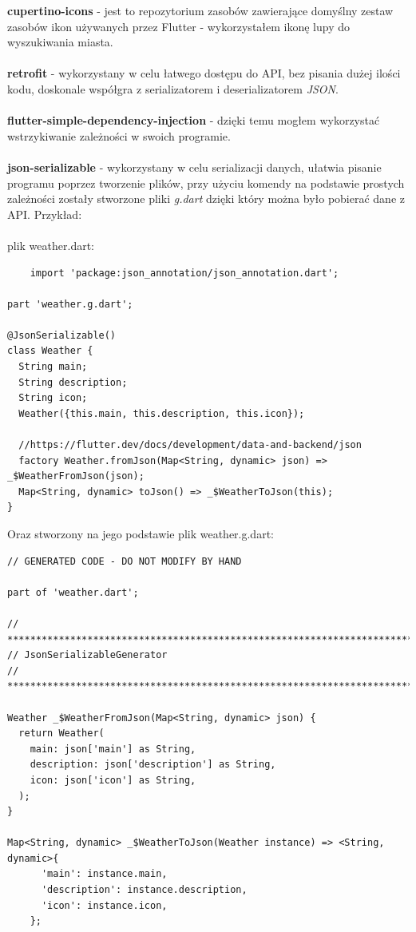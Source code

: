 \documentclass[12pt,a4paper]{article}
\begin{document}
    \newpage
    
    \textbf{cupertino-icons} - jest to repozytorium zasobów zawierające domyślny zestaw zasobów ikon używanych przez Flutter - wykorzystałem ikonę lupy do wyszukiwania miasta. \\ \\
    \textbf{retrofit} - wykorzystany w celu łatwego dostępu do API, bez pisania dużej ilości kodu, doskonale współgra z serializatorem i deserializatorem \textit{JSON}. \\ \\
    \textbf{flutter-simple-dependency-injection} - dzięki temu mogłem wykorzystać wstrzykiwanie zależności w swoich programie. \\ \\
    \textbf{json-serializable} - wykorzystany w celu serializacji danych, ułatwia pisanie programu poprzez tworzenie plików, przy użyciu komendy na podstawie prostych zależności zostały stworzone pliki \textit{g.dart} dzięki który można było pobierać dane z API. Przykład: \\ \\
    plik weather.dart:
    \begin{verbatim}
    import 'package:json_annotation/json_annotation.dart';

part 'weather.g.dart';

@JsonSerializable()
class Weather {
  String main;
  String description;
  String icon;
  Weather({this.main, this.description, this.icon});

  //https://flutter.dev/docs/development/data-and-backend/json
  factory Weather.fromJson(Map<String, dynamic> json) => _$WeatherFromJson(json);
  Map<String, dynamic> toJson() => _$WeatherToJson(this);
}

    \end{verbatim}
Oraz stworzony na jego podstawie plik weather.g.dart:
\begin{verbatim}
// GENERATED CODE - DO NOT MODIFY BY HAND

part of 'weather.dart';

// **************************************************************************
// JsonSerializableGenerator
// **************************************************************************

Weather _$WeatherFromJson(Map<String, dynamic> json) {
  return Weather(
    main: json['main'] as String,
    description: json['description'] as String,
    icon: json['icon'] as String,
  );
}

Map<String, dynamic> _$WeatherToJson(Weather instance) => <String, dynamic>{
      'main': instance.main,
      'description': instance.description,
      'icon': instance.icon,
    };

\end{verbatim}
\end{document}
